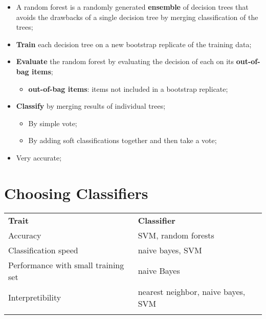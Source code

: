     \begin{itemize}
      \item A random forest is a randomly generated \textbf{ensemble} of decision trees that avoids the drawbacks of a single decision tree by merging classification of the trees;
      \item \textbf{Train} each decision tree on a new bootstrap replicate of the training data;
      \item \textbf{Evaluate} the random forest by evaluating the decision of each on its \textbf{out-of-bag items};
      \begin{itemize}
        \item \textbf{out-of-bag items}: items not included in a bootstrap replicate;
      \end{itemize}
      
      \item \textbf{Classify} by merging results of individual trees;
      \begin{itemize}
        \item By simple vote;
        \item By adding soft classifications together and then take a vote;
      \end{itemize}
      
      \item Very accurate;
    \end{itemize}
    
\section{Choosing Classifiers}

  \begin{tabu} to \linewidth{ X[1,l] | X[2,l] }
    \thickhline
    \textbf{Trait} & \textbf{Classifier} \\
    \thickhline
    Accuracy & SVM, random forests \\ \hline
    Classification speed & naive bayes, SVM \\ \hline
    Performance with small training set & naive Bayes \\ \hline
    Interpretibility & nearest neighbor, naive bayes, SVM \\ \thickhline
  \end{tabu}